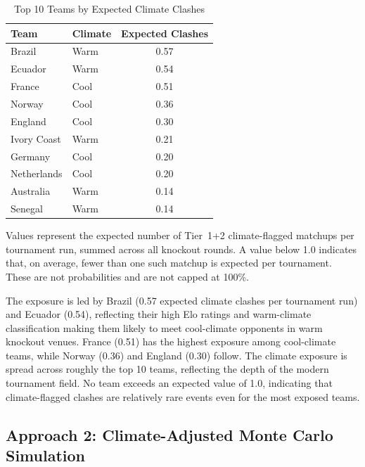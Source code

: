 \documentclass[11pt,a4paper]{article}
\begin{document}
\begin{table}[H]
    \centering
    \caption{Top 10 Teams by Expected Climate Clashes}
    \label{tab:exposure}
    \begin{tabular}{@{}llc@{}}
        \toprule
        Team & Climate & Expected Clashes \\
        \midrule
        Brazil       & Warm & 0.57 \\
        Ecuador      & Warm & 0.54 \\
        France       & Cool & 0.51 \\
        Norway       & Cool & 0.36 \\
        England      & Cool & 0.30 \\
        Ivory Coast  & Warm & 0.21 \\
        Germany      & Cool & 0.20 \\
        Netherlands  & Cool & 0.20 \\
        Australia    & Warm & 0.14 \\
        Senegal      & Warm & 0.14 \\
        \bottomrule
    \end{tabular}
    \vspace{4pt}
    \par\footnotesize Values represent the expected number of Tier~1+2 climate-flagged matchups per tournament run, summed across all knockout rounds. A value below 1.0 indicates that, on average, fewer than one such matchup is expected per tournament. These are not probabilities and are not capped at 100\%.
\end{table}

The exposure is led by Brazil (0.57 expected climate clashes per tournament run) and Ecuador (0.54), reflecting their high Elo ratings and warm-climate classification making them likely to meet cool-climate opponents in warm knockout venues. France (0.51) has the highest exposure among cool-climate teams, while Norway (0.36) and England (0.30) follow. The climate exposure is spread across roughly the top 10 teams, reflecting the depth of the modern tournament field. No team exceeds an expected value of 1.0, indicating that climate-flagged clashes are relatively rare events even for the most exposed teams.

\subsection{Approach 2: Climate-Adjusted Monte Carlo Simulation}
\end{document}

